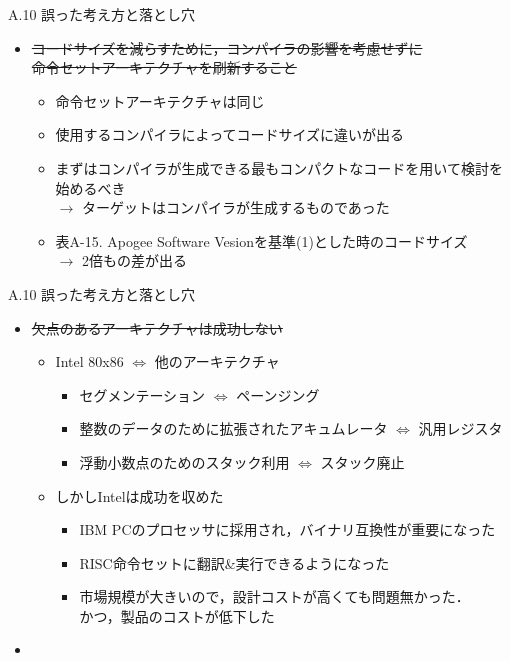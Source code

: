 \documentclass[dvipdfmx]{beamer}
\begin{document}
	\begin{frame}{A.10 誤った考え方と落とし穴}
		\begin{itemize}
			\item \sout{コードサイズを減らすために，コンパイラの影響を考慮せずに}\\
				\sout{命令セットアーキテクチャを刷新すること}
				\begin{itemize}
					\item 命令セットアーキテクチャは同じ
					\item 使用するコンパイラによってコードサイズに違いが出る
					\item まずはコンパイラが生成できる最もコンパクトなコードを用いて検討を始めるべき\\
						$\to$ ターゲットはコンパイラが生成するものであった
					\item 表A-15. Apogee Software Vesionを基準(1)とした時のコードサイズ\\
						$\to$ 2倍もの差が出る
				\end{itemize}
		\end{itemize}
	\end{frame}

	\begin{frame}{A.10 誤った考え方と落とし穴}
		\begin{itemize}
			\item \sout{欠点のあるアーキテクチャは成功しない}\\
				\begin{itemize}
					\item Intel 80x86 $\Leftrightarrow$ 他のアーキテクチャ
						\begin{itemize}
							\item セグメンテーション $\Leftrightarrow$ ペーンジング
							\item 整数のデータのために拡張されたアキュムレータ $\Leftrightarrow$ 汎用レジスタ
							\item 浮動小数点のためのスタック利用 $\Leftrightarrow$ スタック廃止
						\end{itemize}
					\item しかしIntelは成功を収めた
						\begin{itemize}
							\item IBM PCのプロセッサに採用され，バイナリ互換性が重要になった
							\item RISC命令セットに翻訳\&実行できるようになった
							\item 市場規模が大きいので，設計コストが高くても問題無かった．\\かつ，製品のコストが低下した
						\end{itemize}
				\end{itemize}
			\item {}
		\end{itemize}
	\end{frame}
\end{document}
